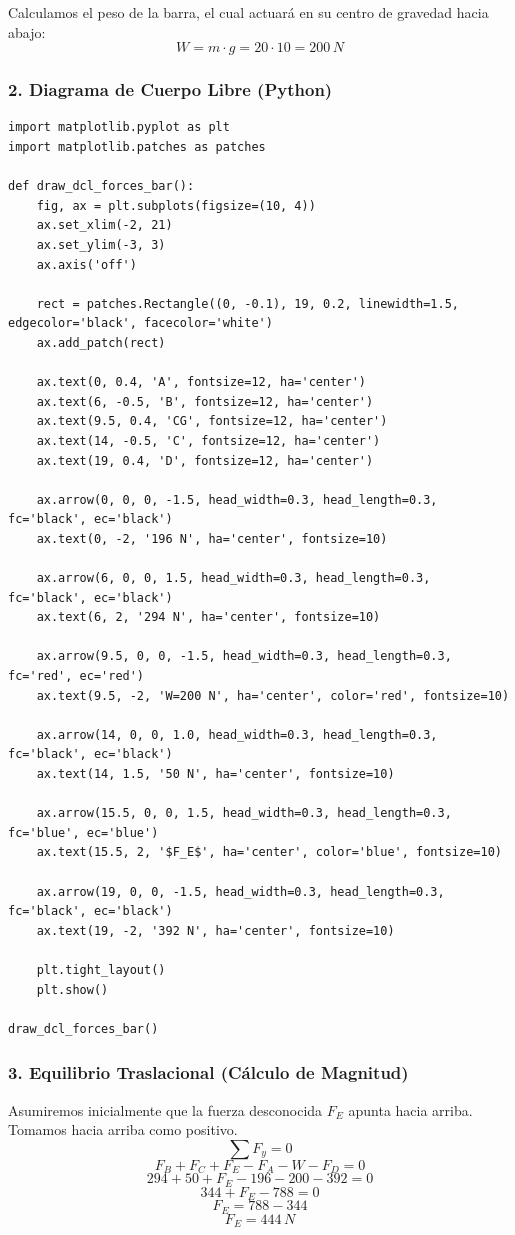 \documentclass[12pt, a4paper]{article}
\begin{document}
Calculamos el peso de la barra, el cual actuará en su centro de gravedad hacia abajo:
$$W = m \cdot g = 20 \cdot 10 = 200 \, \si{N}$$

\subsubsection*{2. Diagrama de Cuerpo Libre (Python)}

\begin{lstlisting}
import matplotlib.pyplot as plt
import matplotlib.patches as patches

def draw_dcl_forces_bar():
    fig, ax = plt.subplots(figsize=(10, 4))
    ax.set_xlim(-2, 21)
    ax.set_ylim(-3, 3)
    ax.axis('off')

    rect = patches.Rectangle((0, -0.1), 19, 0.2, linewidth=1.5, edgecolor='black', facecolor='white')
    ax.add_patch(rect)

    ax.text(0, 0.4, 'A', fontsize=12, ha='center')
    ax.text(6, -0.5, 'B', fontsize=12, ha='center')
    ax.text(9.5, 0.4, 'CG', fontsize=12, ha='center')
    ax.text(14, -0.5, 'C', fontsize=12, ha='center')
    ax.text(19, 0.4, 'D', fontsize=12, ha='center')

    ax.arrow(0, 0, 0, -1.5, head_width=0.3, head_length=0.3, fc='black', ec='black')
    ax.text(0, -2, '196 N', ha='center', fontsize=10)

    ax.arrow(6, 0, 0, 1.5, head_width=0.3, head_length=0.3, fc='black', ec='black')
    ax.text(6, 2, '294 N', ha='center', fontsize=10)

    ax.arrow(9.5, 0, 0, -1.5, head_width=0.3, head_length=0.3, fc='red', ec='red')
    ax.text(9.5, -2, 'W=200 N', ha='center', color='red', fontsize=10)

    ax.arrow(14, 0, 0, 1.0, head_width=0.3, head_length=0.3, fc='black', ec='black')
    ax.text(14, 1.5, '50 N', ha='center', fontsize=10)

    ax.arrow(15.5, 0, 0, 1.5, head_width=0.3, head_length=0.3, fc='blue', ec='blue')
    ax.text(15.5, 2, '$F_E$', ha='center', color='blue', fontsize=10)

    ax.arrow(19, 0, 0, -1.5, head_width=0.3, head_length=0.3, fc='black', ec='black')
    ax.text(19, -2, '392 N', ha='center', fontsize=10)

    plt.tight_layout()
    plt.show()

draw_dcl_forces_bar()
\end{lstlisting}

\subsubsection*{3. Equilibrio Traslacional (Cálculo de Magnitud)}
Asumiremos inicialmente que la fuerza desconocida $F_E$ apunta hacia arriba. Tomamos hacia arriba como positivo.
$$\sum F_y = 0$$
$$F_B + F_C + F_E - F_A - W - F_D = 0$$
$$294 + 50 + F_E - 196 - 200 - 392 = 0$$
$$344 + F_E - 788 = 0$$
$$F_E = 788 - 344$$
$$F_E = 444 \, \si{N}$$
\end{document}
